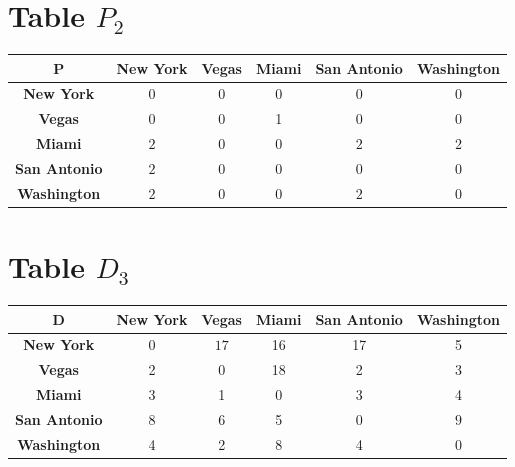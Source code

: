 \documentclass{article}
\begin{document}
\section{Table $P_{2}$}
\begin{center}
    \begin{tabular}{|c||c|c|c|c|c|}
        \hline
        \textbf{P} & \textbf{New York} & \textbf{Vegas} & \textbf{Miami} & \textbf{San Antonio} & \textbf{Washington} \\
        \hline
        \hline
        \textbf{New York}& 0 & 0 & 0 & 0 & 0 \\
        \hline
        \textbf{Vegas}& 0 & 0 & 1 & 0 & 0 \\
        \hline
        \textbf{Miami}& \cellcolor[HTML]{D74894}$2$ & 0 & 0 & \cellcolor[HTML]{D74894}$2$ & \cellcolor[HTML]{D74894}$2$ \\
        \hline
        \textbf{San Antonio}& \cellcolor[HTML]{D74894}$2$ & 0 & 0 & 0 & 0 \\
        \hline
        \textbf{Washington}& \cellcolor[HTML]{D74894}$2$ & 0 & 0 & \cellcolor[HTML]{D74894}$2$ & 0 \\
        \hline
    \end{tabular}
\end{center}


\section{Table $D_{3}$}
\begin{center}
    \begin{tabular}{|c||c|c|c|c|c|}
        \hline
        \textbf{D} & \textbf{New York} & \textbf{Vegas} & \textbf{Miami} & \textbf{San Antonio} & \textbf{Washington} \\
        \hline
        \hline
        \textbf{New York}& 0 & \cellcolor[HTML]{D74894}$17$ & 16 & 17 & 5 \\
        \hline
        \textbf{Vegas}& 2 & 0 & 18 & 2 & 3 \\
        \hline
        \textbf{Miami}& 3 & 1 & 0 & 3 & 4 \\
        \hline
        \textbf{San Antonio}& \cellcolor[HTML]{D74894}$8$ & \cellcolor[HTML]{D74894}$6$ & 5 & 0 & \cellcolor[HTML]{D74894}$9$ \\
        \hline
        \textbf{Washington}& 4 & 2 & 8 & 4 & 0 \\
        \hline
    \end{tabular}
\end{center}
\end{document}
